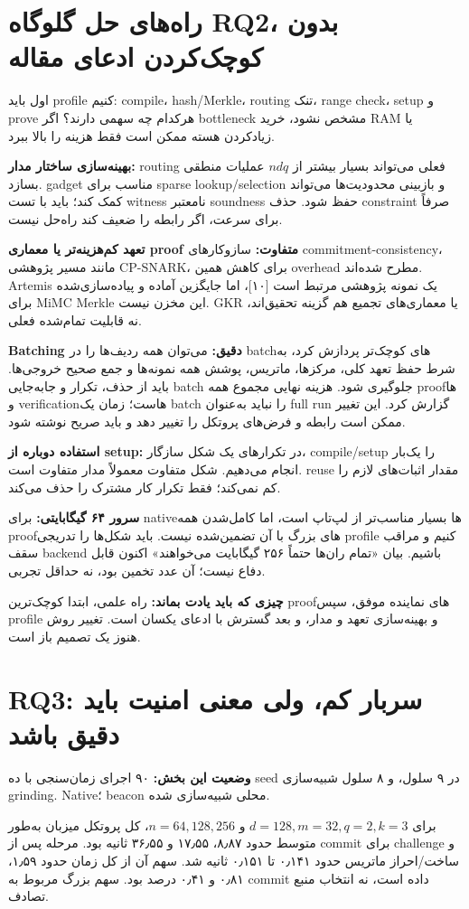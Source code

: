 \documentclass[11pt,a4paper]{article}
\newcommand{\lesson}[1]{\clearpage\section{#1}}
\newcommand{\takeaway}[1]{\par\textbf{چیزی که باید یادت بماند:} #1\par}
\newcommand{\status}[1]{\textbf{وضعیت این بخش:} #1\par}
\begin{document}
\lesson{راه‌های حل گلوگاه RQ2، بدون کوچک‌کردن ادعای مقاله}
اول باید profile کنیم: compile، hash/Merkle، routing تنک، range check، setup و prove هرکدام چه سهمی دارند؟ اگر bottleneck مشخص نشود، خرید RAM یا زیادکردن هسته ممکن است فقط هزینه را بالا ببرد.

\textbf{بهینه‌سازی ساختار مدار:} routing فعلی می‌تواند بسیار بیشتر از \(ndq\) عملیات منطقی بسازد. gadget مناسب برای sparse lookup/selection و بازبینی محدودیت‌ها می‌تواند کمک کند؛ باید با تست witness نامعتبر soundness حفظ شود. حذف constraint صرفاً برای سرعت، اگر رابطه را ضعیف کند راه‌حل نیست.

\textbf{تعهد کم‌هزینه‌تر یا معماری proof متفاوت:} سازوکارهای commitment-consistency، مانند مسیر پژوهشی CP-SNARK، برای کاهش همین overhead مطرح شده‌اند. Artemis یک نمونه پژوهشی مرتبط است [۱۰]، اما جایگزین آماده و پیاده‌سازی‌شده برای MiMC Merkle این مخزن نیست. GKR یا معماری‌های تجمیع هم گزینه تحقیق‌اند، نه قابلیت تمام‌شده فعلی.

\textbf{Batching دقیق:} می‌توان همه ردیف‌ها را در batchهای کوچک‌تر پردازش کرد، به شرط حفظ تعهد کلی، مرکزها، ماتریس، پوشش همه نمونه‌ها و جمع صحیح خروجی‌ها. باید از حذف، تکرار و جابه‌جایی batch جلوگیری شود. هزینه نهایی مجموع همه proofها و verificationهاست؛ زمان یک batch را نباید به‌عنوان full run گزارش کرد. این تغییر ممکن است رابطه و فرض‌های پروتکل را تغییر دهد و باید صریح نوشته شود.

\textbf{استفاده دوباره از setup:} در تکرارهای یک شکل سازگار، compile/setup را یک‌بار انجام می‌دهیم. شکل متفاوت معمولاً مدار متفاوت است. reuse مقدار اثبات‌های لازم را کم نمی‌کند؛ فقط تکرار کار مشترک را حذف می‌کند.

\textbf{سرور ۶۴ گیگابایتی:} برای nativeها بسیار مناسب‌تر از لپ‌تاپ است، اما کامل‌شدن همه proofهای بزرگ با آن تضمین‌شده نیست. باید شکل‌ها را تدریجی profile کنیم و مراقب سقف backend باشیم. بیان «تمام ران‌ها حتماً ۲۵۶ گیگابایت می‌خواهند» اکنون قابل دفاع نیست؛ آن عدد تخمین بود، نه حداقل تجربی.

\takeaway{راه علمی، ابتدا کوچک‌ترین proofهای نماینده موفق، سپس profile و بهینه‌سازی تعهد و مدار، و بعد گسترش با ادعای یکسان است. تغییر روش هنوز یک تصمیم باز است.}

\lesson{RQ3: سربار کم، ولی معنی امنیت باید دقیق باشد}
\status{۹۰ اجرای زمان‌سنجی با ده seed در ۹ سلول، و ۸ سلول شبیه‌سازی grinding. Native؛ beacon محلی شبیه‌سازی شده.}
برای \(d=128,m=32,q=2,k=3\) و \(n=64,128,256\)، کل پروتکل میزبان به‌طور متوسط حدود ۸٫۸۷، ۱۷٫۵۵ و ۳۶٫۵۵ ثانیه بود. مرحله پس از commit برای challenge و ساخت/احراز ماتریس حدود ۰٫۱۴۱ تا ۰٫۱۵۱ ثانیه شد. سهم آن از کل زمان حدود ۱٫۵۹، ۰٫۸۱ و ۰٫۴۱ درصد بود. سهم بزرگ مربوط به commit داده است، نه انتخاب منبع تصادف.
\end{document}
